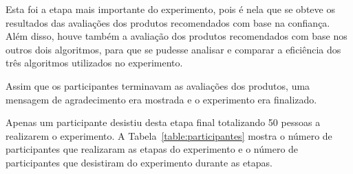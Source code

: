 Esta foi a etapa mais importante do experimento, pois é nela que se obteve os resultados das avaliações dos produtos recomendados com base na confiança. Além disso, houve também a avaliação dos produtos recomendados com base nos outros dois algoritmos, para que se pudesse analisar e comparar a eficiência dos três algoritmos utilizados no experimento.

Assim que os participantes terminavam as avaliações dos produtos, uma mensagem de agradecimento era mostrada e o experimento era finalizado.

Apenas um participante desistiu desta etapa final totalizando 50 pessoas a realizarem o experimento. A Tabela~\ref{table:participantes} mostra o número de participantes que realizaram as etapas do experimento e o número de participantes que desistiram do experimento durante as etapas.